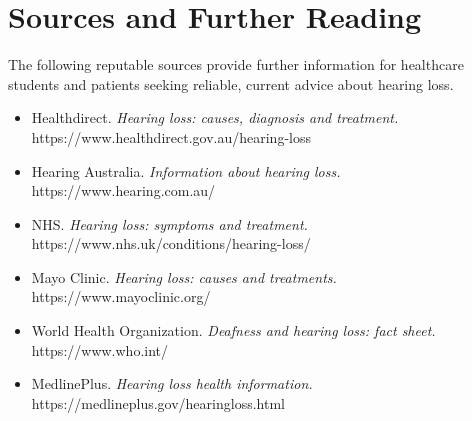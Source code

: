 \section*{Sources and Further Reading}
The following reputable sources provide further information for healthcare students and patients seeking reliable, current advice about hearing loss.

\begin{itemize}
    \item Healthdirect. \textit{Hearing loss: causes, diagnosis and treatment.} https://www.healthdirect.gov.au/hearing-loss
    \item Hearing Australia. \textit{Information about hearing loss.} https://www.hearing.com.au/
    \item NHS. \textit{Hearing loss: symptoms and treatment.} https://www.nhs.uk/conditions/hearing-loss/
    \item Mayo Clinic. \textit{Hearing loss: causes and treatments.} https://www.mayoclinic.org/
    \item World Health Organization. \textit{Deafness and hearing loss: fact sheet.} https://www.who.int/
    \item MedlinePlus. \textit{Hearing loss health information.} https://medlineplus.gov/hearingloss.html
\end{itemize}
